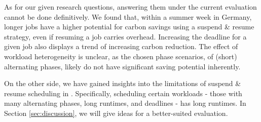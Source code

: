 As for our given research questions, answering them under the current evaluation cannot be done definitively. We found that, within a summer week in Germany, longer jobs have a higher potential for carbon savings using a suspend \& resume strategy, even if resuming a job carries overhead. Increasing the deadline for a given job also displays a trend of increasing carbon reduction.
The effect of workload heterogeneity is unclear, as the chosen phase scenarios, of (short) alternating phases, likely do not have significant saving potential inherently.

On the other side, we have gained insights into the limitations of suspend \& resume scheduling in \programname{}. Specifically, scheduling certain workloads - those with many alternating phases, long runtimes, and deadlines - has long runtimes.
In Section \ref{sec:discussion}, we will give ideas for a better-suited evaluation.


